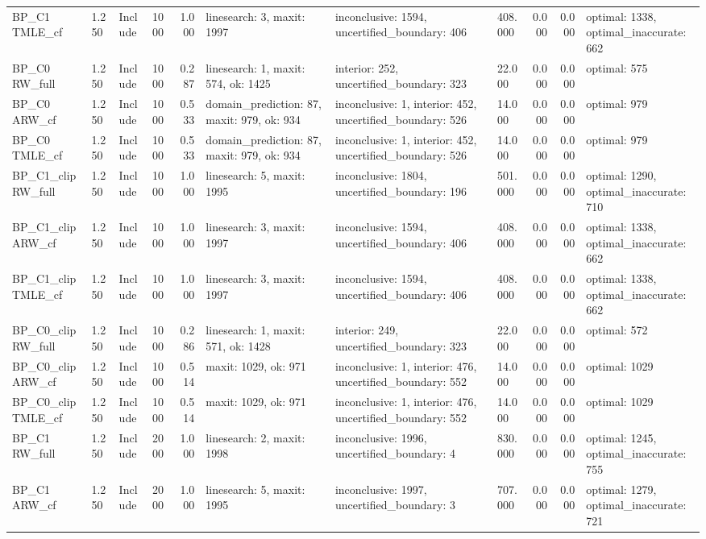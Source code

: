 \begin{tabular}{llllrlllrrl}
BP\_C1 TMLE\_cf & 1.250 & Include & 1000 & 1.000 & linesearch: 3, maxit: 1997 & inconclusive: 1594, uncertified\_boundary: 406 & 408.000 & 0.000 & 0.000 & optimal: 1338, optimal\_inaccurate: 662 \\
BP\_C0 RW\_full & 1.250 & Include & 1000 & 0.287 & linesearch: 1, maxit: 574, ok: 1425 & interior: 252, uncertified\_boundary: 323 & 22.000 & 0.000 & 0.000 & optimal: 575 \\
BP\_C0 ARW\_cf & 1.250 & Include & 1000 & 0.533 & domain\_prediction: 87, maxit: 979, ok: 934 & inconclusive: 1, interior: 452, uncertified\_boundary: 526 & 14.000 & 0.000 & 0.000 & optimal: 979 \\
BP\_C0 TMLE\_cf & 1.250 & Include & 1000 & 0.533 & domain\_prediction: 87, maxit: 979, ok: 934 & inconclusive: 1, interior: 452, uncertified\_boundary: 526 & 14.000 & 0.000 & 0.000 & optimal: 979 \\
BP\_C1\_clip RW\_full & 1.250 & Include & 1000 & 1.000 & linesearch: 5, maxit: 1995 & inconclusive: 1804, uncertified\_boundary: 196 & 501.000 & 0.000 & 0.000 & optimal: 1290, optimal\_inaccurate: 710 \\
BP\_C1\_clip ARW\_cf & 1.250 & Include & 1000 & 1.000 & linesearch: 3, maxit: 1997 & inconclusive: 1594, uncertified\_boundary: 406 & 408.000 & 0.000 & 0.000 & optimal: 1338, optimal\_inaccurate: 662 \\
BP\_C1\_clip TMLE\_cf & 1.250 & Include & 1000 & 1.000 & linesearch: 3, maxit: 1997 & inconclusive: 1594, uncertified\_boundary: 406 & 408.000 & 0.000 & 0.000 & optimal: 1338, optimal\_inaccurate: 662 \\
BP\_C0\_clip RW\_full & 1.250 & Include & 1000 & 0.286 & linesearch: 1, maxit: 571, ok: 1428 & interior: 249, uncertified\_boundary: 323 & 22.000 & 0.000 & 0.000 & optimal: 572 \\
BP\_C0\_clip ARW\_cf & 1.250 & Include & 1000 & 0.514 & maxit: 1029, ok: 971 & inconclusive: 1, interior: 476, uncertified\_boundary: 552 & 14.000 & 0.000 & 0.000 & optimal: 1029 \\
BP\_C0\_clip TMLE\_cf & 1.250 & Include & 1000 & 0.514 & maxit: 1029, ok: 971 & inconclusive: 1, interior: 476, uncertified\_boundary: 552 & 14.000 & 0.000 & 0.000 & optimal: 1029 \\
BP\_C1 RW\_full & 1.250 & Include & 2000 & 1.000 & linesearch: 2, maxit: 1998 & inconclusive: 1996, uncertified\_boundary: 4 & 830.000 & 0.000 & 0.000 & optimal: 1245, optimal\_inaccurate: 755 \\
BP\_C1 ARW\_cf & 1.250 & Include & 2000 & 1.000 & linesearch: 5, maxit: 1995 & inconclusive: 1997, uncertified\_boundary: 3 & 707.000 & 0.000 & 0.000 & optimal: 1279, optimal\_inaccurate: 721 \\

\end{tabular}
